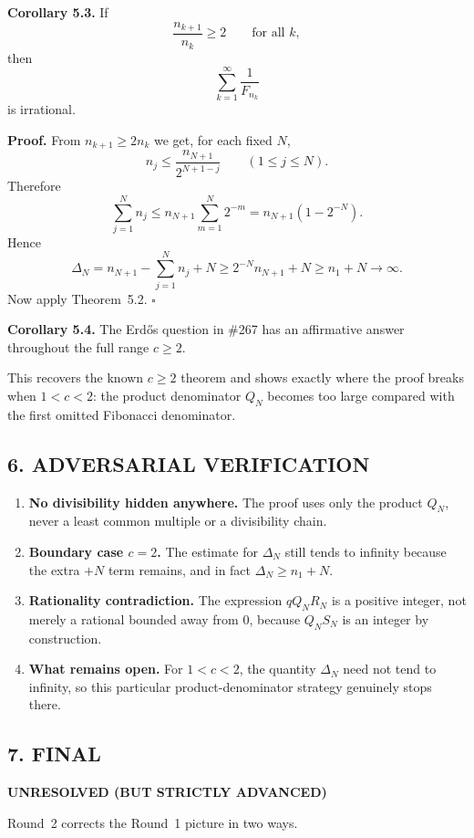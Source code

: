 \medskip
\noindent
\textbf{Corollary 5.3.}
If
\[
\frac{n_{k+1}}{n_k}\ge 2
\qquad\mbox{for all }k,
\]
then
\[
\sum_{k=1}^{\infty}\frac{1}{F_{n_k}}
\]
is irrational.

\medskip
\noindent
\textbf{Proof.}
From $n_{k+1}\ge 2n_k$ we get, for each fixed $N$,
\[
n_j\le \frac{n_{N+1}}{2^{N+1-j}}
\qquad (1\le j\le N).
\]
Therefore
\[
\sum_{j=1}^{N}n_j
\le n_{N+1}\sum_{m=1}^{N}2^{-m}
= n_{N+1}(1-2^{-N}).
\]
Hence
\[
\Delta_N
= n_{N+1}-\sum_{j=1}^{N}n_j+N
\ge 2^{-N}n_{N+1}+N
\ge n_1+N
\to\infty.
\]
Now apply Theorem~5.2.
\hfill $\square$

\medskip
\noindent
\textbf{Corollary 5.4.}
The Erd\H{o}s question in \#267 has an affirmative answer throughout the full range $c\ge 2$.

\medskip
This recovers the known $c\ge 2$ theorem and shows exactly where the proof breaks when $1<c<2$: the product denominator $Q_N$ becomes too large compared with the first omitted Fibonacci denominator.

\subsection*{6. ADVERSARIAL VERIFICATION}

\begin{enumerate}
\item \textbf{No divisibility hidden anywhere.}  The proof uses only the product $Q_N$, never a least common multiple or a divisibility chain.
\item \textbf{Boundary case $c=2$.}  The estimate for $\Delta_N$ still tends to infinity because the extra $+N$ term remains, and in fact $\Delta_N\ge n_1+N$.
\item \textbf{Rationality contradiction.}  The expression $qQ_N R_N$ is a positive integer, not merely a rational bounded away from $0$, because $Q_N S_N$ is an integer by construction.
\item \textbf{What remains open.}  For $1<c<2$, the quantity $\Delta_N$ need not tend to infinity, so this particular product-denominator strategy genuinely stops there.
\end{enumerate}

\subsection*{7. FINAL}

\textbf{UNRESOLVED (BUT STRICTLY ADVANCED)}

\medskip
Round~2 corrects the Round~1 picture in two ways.

